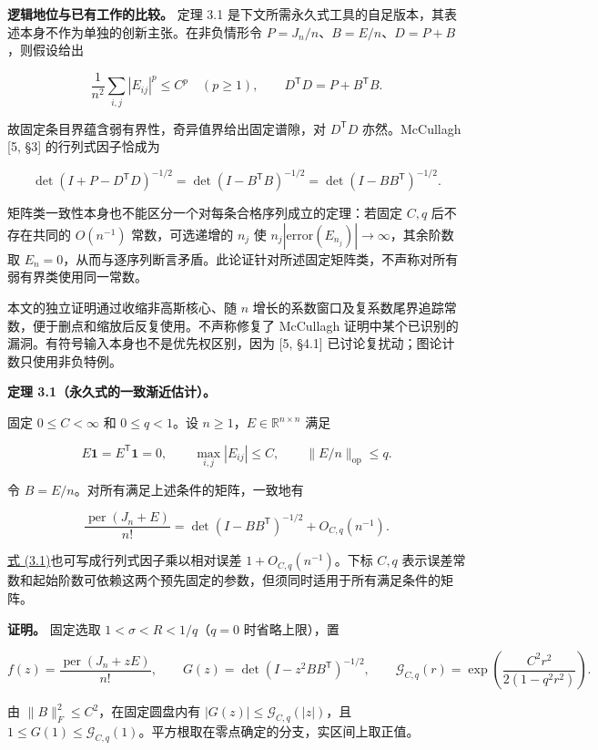 \documentclass[11pt,a4paper]{article}
\begin{document}
\textbf{逻辑地位与已有工作的比较。} 定理 3.1 是下文所需永久式工具的自足版本，其表述本身不作为单独的创新主张。在非负情形令 \(P=J_n/n\)、\(B=E/n\)、\(D=P+B\)，则假设给出

\[
\frac1{n^2}\sum_{i,j}|E_{ij}|^p\le C^p\quad(p\ge1),\qquad
D^{\mathsf T}D=P+B^{\mathsf T}B.
\]

故固定条目界蕴含弱有界性，奇异值界给出固定谱隙，对 \(D^{\mathsf T}D\) 亦然。McCullagh {[}5, §3{]} 的行列式因子恰成为

\[
\det(I+P-D^{\mathsf T}D)^{-1/2}
=\det(I-B^{\mathsf T}B)^{-1/2}
=\det(I-BB^{\mathsf T})^{-1/2}.
\]

矩阵类一致性本身也不能区分一个对每条合格序列成立的定理：若固定 \(C,q\) 后不存在共同的 \(O(n^{-1})\) 常数，可选递增的 \(n_j\) 使 \(n_j|\mathrm{error}(E_{n_j})|\to\infty\)，其余阶数取 \(E_n=0\)，从而与逐序列断言矛盾。此论证针对所述固定矩阵类，不声称对所有弱有界类使用同一常数。

本文的独立证明通过收缩非高斯核心、随 \(n\) 增长的系数窗口及复系数尾界追踪常数，便于删点和缩放后反复使用。不声称修复了 McCullagh 证明中某个已识别的漏洞。有符号输入本身也不是优先权区别，因为 {[}5, §4.1{]} 已讨论复扰动；图论计数只使用非负特例。

\textbf{定理 3.1（永久式的一致渐近估计）。}

固定 \(0\le C<\infty\) 和 \(0\le q<1\)。设 \(n\ge1\)，\(E\in\mathbb R^{n\times n}\) 满足

\[
E\mathbf1=E^{\mathsf T}\mathbf1=0,\qquad
\max_{i,j}|E_{ij}|\le C,\qquad
\|E/n\|_{\mathrm{op}}\le q.
\]

令 \(B=E/n\)。对所有满足上述条件的矩阵，一致地有

\begin{equation}
\frac{\operatorname{per}(J_n+E)}{n!}
=\det(I-BB^{\mathsf T})^{-1/2}+O_{C,q}(n^{-1}).
\tag{3.1}
\label{eq-uniform-permanent}
\end{equation}

\hyperref[eq-uniform-permanent]{式 (3.1)}也可写成行列式因子乘以相对误差 \(1+O_{C,q}(n^{-1})\)。下标 \(C,q\) 表示误差常数和起始阶数可依赖这两个预先固定的参数，但须同时适用于所有满足条件的矩阵。

\textbf{证明。} 固定选取 \(1<\sigma<R<1/q\)（\(q=0\) 时省略上限），置

\[
f(z)=\frac{\operatorname{per}(J_n+zE)}{n!},\qquad
G(z)=\det(I-z^2BB^{\mathsf T})^{-1/2},\qquad
\mathcal G_{C,q}(r)=\exp\!\left(\frac{C^2r^2}{2(1-q^2r^2)}\right).
\]

由 \(\|B\|_F^2\le C^2\)，在固定圆盘内有 \(|G(z)|\le\mathcal G_{C,q}(|z|)\)，且 \(1\le G(1)\le\mathcal G_{C,q}(1)\)。平方根取在零点确定的分支，实区间上取正值。
\end{document}
